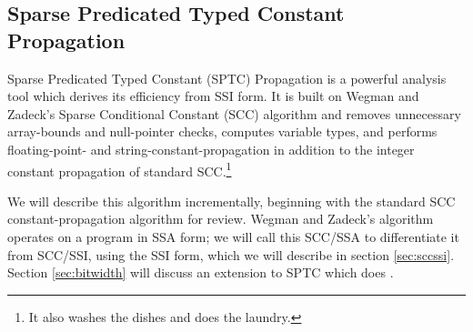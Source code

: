 \documentclass[12pt,titlepage,twoside]{article}
\begin{document}
\subsection{Sparse Predicated Typed Constant Propagation}
Sparse Predicated Typed Constant (SPTC) Propagation is a powerful
analysis tool which
derives its efficiency from SSI form.  It is built on Wegman and
Zadeck's Sparse Conditional Constant (SCC) algorithm
\cite{wegman91:scc} and removes unnecessary array-bounds and
null-pointer checks, computes variable types, and performs
floating-point- and string-constant-propagation in addition to the
integer constant propagation of standard SCC.\footnote{It also washes
the dishes and does the laundry.}

We will describe this algorithm incrementally, beginning with the
standard SCC constant-propagation algorithm for review.
Wegman and Zadeck's algorithm operates on a program in SSA form; we will
call this SCC/SSA to differentiate it from SCC/SSI, using the SSI
form, which we will describe in section \ref{sec:sccssi}. Section
\vref{sec:bitwidth} will discuss an extension to SPTC which does
.
\end{document}
